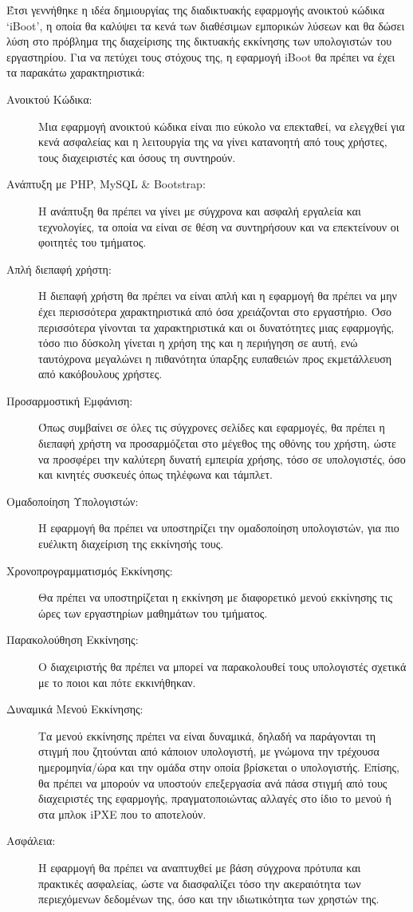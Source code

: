 Έτσι γεννήθηκε η ιδέα δημιουργίας της διαδικτυακής εφαρμογής ανοικτού κώδικα `iBoot', η οποία θα καλύψει τα κενά των διαθέσιμων εμπορικών λύσεων και θα δώσει λύση στο πρόβλημα της διαχείρισης της δικτυακής εκκίνησης των υπολογιστών του εργαστηρίου. Για να πετύχει τους στόχους της, η εφαρμογή iBoot θα πρέπει να έχει τα παρακάτω χαρακτηριστικά:
\begin{description}
	\item [Ανοικτού Κώδικα:] Μια εφαρμογή ανοικτού κώδικα είναι πιο εύκολο να επεκταθεί, να ελεγχθεί για κενά ασφαλείας και η λειτουργία της να γίνει κατανοητή από τους χρήστες, τους διαχειριστές και όσους τη συντηρούν.
	\item [Ανάπτυξη με PHP, MySQL \& Bootstrap:] Η ανάπτυξη θα πρέπει να γίνει με σύγχρονα και ασφαλή εργαλεία και τεχνολογίες, τα οποία να είναι σε θέση να συντηρήσουν και να επεκτείνουν οι φοιτητές του τμήματος.
	\item [Απλή διεπαφή χρήστη:] Η διεπαφή χρήστη θα πρέπει να είναι απλή και η εφαρμογή θα πρέπει να μην έχει περισσότερα χαρακτηριστικά από όσα χρειάζονται στο εργαστήριο. Όσο περισσότερα γίνονται τα χαρακτηριστικά και οι δυνατότητες μιας εφαρμογής, τόσο πιο δύσκολη γίνεται η χρήση της και η περιήγηση σε αυτή, ενώ ταυτόχρονα μεγαλώνει η πιθανότητα ύπαρξης ευπαθειών προς εκμετάλλευση από κακόβουλους χρήστες.
	\item [Προσαρμοστική Εμφάνιση:] Όπως συμβαίνει σε όλες τις σύγχρονες σελίδες και εφαρμογές, θα πρέπει η διεπαφή χρήστη να προσαρμόζεται στο μέγεθος της οθόνης του χρήστη, ώστε να προσφέρει την καλύτερη δυνατή εμπειρία χρήσης, τόσο σε υπολογιστές, όσο και κινητές συσκευές όπως τηλέφωνα και τάμπλετ.
	\item [Ομαδοποίηση Υπολογιστών:] Η εφαρμογή θα πρέπει να υποστηρίζει την ομαδοποίηση υπολογιστών, για πιο ευέλικτη διαχείριση της εκκίνησής τους.
	\item [Χρονοπρογραμματισμός Εκκίνησης:] Θα πρέπει να υποστηρίζεται η εκκίνηση με διαφορετικό μενού εκκίνησης τις ώρες των εργαστηρίων μαθημάτων του τμήματος.
	\item [Παρακολούθηση Εκκίνησης:] Ο διαχειριστής θα πρέπει να μπορεί να παρακολουθεί τους υπολογιστές σχετικά με το ποιοι και πότε εκκινήθηκαν.
	\item [Δυναμικά Μενού Εκκίνησης:] Τα μενού εκκίνησης πρέπει να είναι δυναμικά, δηλαδή να παράγονται τη στιγμή που ζητούνται από κάποιον υπολογιστή, με γνώμονα την τρέχουσα ημερομηνία/ώρα και την ομάδα στην οποία βρίσκεται ο υπολογιστής. Επίσης, θα πρέπει να μπορούν να υποστούν επεξεργασία ανά πάσα στιγμή από τους διαχειριστές της εφαρμογής, πραγματοποιώντας αλλαγές στο ίδιο το μενού ή στα μπλοκ iPXE που το αποτελούν.
	\item[Ασφάλεια:] Η εφαρμογή θα πρέπει να αναπτυχθεί με βάση σύγχρονα πρότυπα και πρακτικές ασφαλείας, ώστε να διασφαλίζει τόσο την ακεραιότητα των περιεχόμενων δεδομένων της, όσο και την ιδιωτικότητα των χρηστών της.
\end{description}

